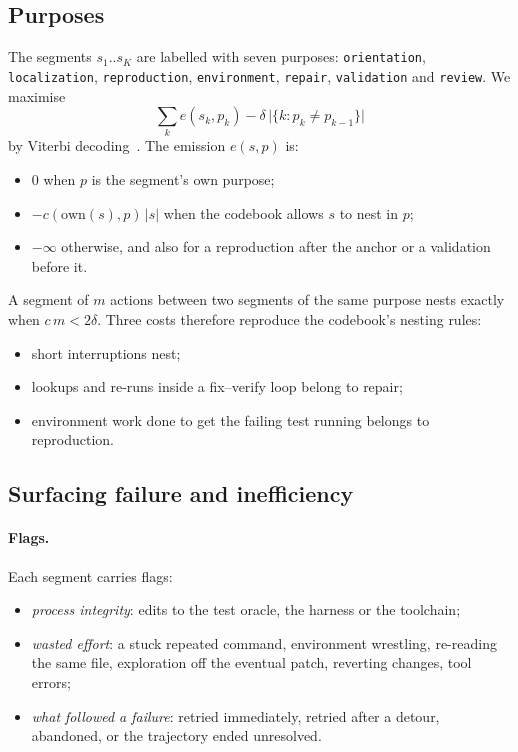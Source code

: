 \documentclass[sigconf,nonacm,10pt]{acmart}
\newcommand{\code}[1]{\texttt{#1}}
\begin{document}
\subsection{Purposes}
\label{sec:purpose}
The segments $s_1..s_K$ are labelled with seven purposes:
\code{orientation}, \code{localization}, \code{reproduction}, \code{environment},
\code{repair}, \code{validation} and \code{review}. We maximise
\begin{equation}
\sum_k e(s_k,p_k) - \delta\,\big|\{k: p_k\neq p_{k-1}\}\big|
\end{equation}
by Viterbi decoding~\cite{rabiner1989hmm}. The emission $e(s,p)$ is:
\begin{itemize}
  \item 0 when $p$ is the segment's own purpose;
  \item $-c(\mathrm{own}(s),p)\,|s|$ when the codebook allows $s$ to nest in $p$;
  \item $-\infty$ otherwise, and also for a reproduction after the anchor or a
        validation before it.
\end{itemize}
A segment of $m$ actions between two segments of the same purpose nests exactly when
$c\,m < 2\delta$. Three costs therefore reproduce the codebook's nesting rules:
\begin{itemize}
  \item short interruptions nest;
  \item lookups and re-runs inside a fix--verify loop belong to repair;
  \item environment work done to get the failing test running belongs to reproduction.
\end{itemize}

\subsection{Surfacing failure and inefficiency}
\label{sec:surface}
\paragraph{Flags.} Each segment carries flags:
\begin{itemize}
  \item \emph{process integrity}: edits to the test oracle, the harness or the
        toolchain;
  \item \emph{wasted effort}: a stuck repeated command, environment wrestling,
        re-reading the same file, exploration off the eventual patch, reverting
        changes, tool errors;
  \item \emph{what followed a failure}: retried immediately, retried after a detour,
        abandoned, or the trajectory ended unresolved.
\end{itemize}
\end{document}
